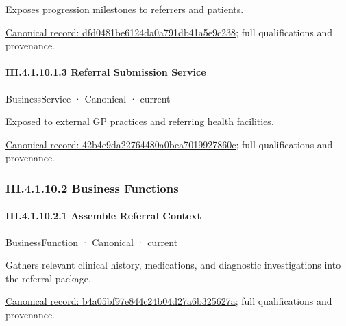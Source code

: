 Exposes progression milestones to referrers and patients.


{\footnotesize \href{../../../../continuum/business/business-service/dfd0481be6124da0a791db41a5e9c238.md}{Canonical record: dfd0481be6124da0a791db41a5e9c238}; full qualifications and provenance.}\par
\paragraph*{III.4.1.10.1.3 Referral Submission Service}
\label{navigation:III.4.1.10.1.3}

\label{element:42b4e9da22764480a0bea7019927860c}
{\small BusinessService · Canonical · current}\par

Exposed to external GP practices and referring health facilities.


{\footnotesize \href{../../../../continuum/business/business-service/42b4e9da22764480a0bea7019927860c.md}{Canonical record: 42b4e9da22764480a0bea7019927860c}; full qualifications and provenance.}\par
\subsubsection*{III.4.1.10.2 Business Functions}
\label{navigation:III.4.1.10.2}

\paragraph*{III.4.1.10.2.1 Assemble Referral Context}
\label{navigation:III.4.1.10.2.1}

\label{element:b4a05bf97e844c24b04d27a6b325627a}
{\small BusinessFunction · Canonical · current}\par

Gathers relevant clinical history, medications, and diagnostic investigations into the referral package.


{\footnotesize \href{../../../../continuum/business/business-function/b4a05bf97e844c24b04d27a6b325627a.md}{Canonical record: b4a05bf97e844c24b04d27a6b325627a}; full qualifications and provenance.}\par
